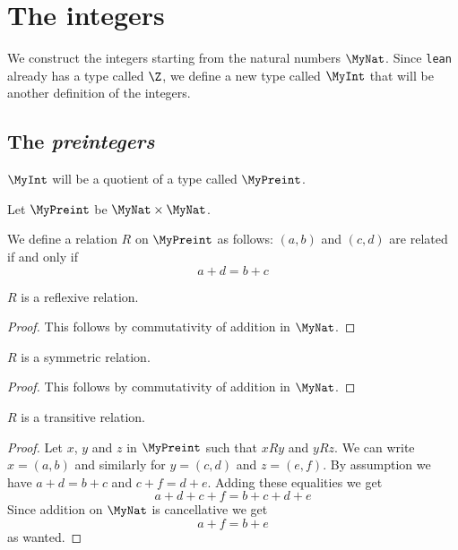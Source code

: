 \chapter{The integers}

We construct the integers starting from the natural numbers $\MyNat$. Since \texttt{lean} already has a
type called $\Z$, we define a new type called $\MyInt$ that will be another definition of the integers.

\section{The \emph{preintegers}}

$\MyInt$ will be a quotient of a type called $\MyPreint$.

\begin{definition}
    \label{MyPreint}
    \leanok
    Let $\MyPreint$ be $\MyNat \times \MyNat$.
\end{definition}

\begin{definition}
    \label{MyPreint.R}
    \leanok
We define a relation $R$ on $\MyPreint$ as follows: $(a,b)$ and $(c, d)$ are related if and only if
\[
a + d = b + c
\]
\end{definition}

\begin{lemma}
$R$ is a reflexive relation.
    \label{MyPreint.R_refl}
    \leanok
\end{lemma}
\begin{proof}
    \leanok
    This follows by commutativity of addition in $\MyNat$.
\end{proof}

\begin{lemma}
$R$ is a symmetric relation.
    \label{MyPreint.R_symm}
    \leanok
\end{lemma}
\begin{proof}
    \leanok
    This follows by commutativity of addition in $\MyNat$.
\end{proof}

\begin{lemma}
$R$ is a transitive relation.
    \label{MyPreint.R_trans}
    \leanok
\end{lemma}
\begin{proof}
    \leanok
    Let $x$, $y$ and $z$ in $\MyPreint$ such that $x R y$ and $y R z$. We can write $x = (a,b)$ and similarly
    for $y = (c,d)$ and $z = (e,f)$. By assumption we have $a+d=b+c$ and $c+f=d+e$. Adding these equalities we get
    \[
    a+d+c+f=b+c+d+e
    \]
    Since addition on $\MyNat$ is cancellative we get
    \[
    a+f = b + e
    \]
    as wanted.
\end{proof}

